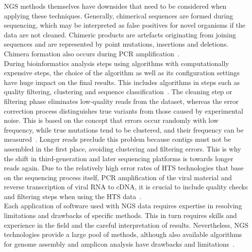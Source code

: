 \ac{NGS} methods themselves have downsides that need to be considered when applying these techniques. Generally, chimerical sequences are formed during sequencing, which may be interpreted as false positives for novel organisms if the data are not cleaned. Chimeric products are artefacts originating from joining sequences and are represented by point mutations, insertions and deletions. Chimera formation also occurs during \ac{PCR} amplification~\cite{zylstra1998pcr}.\\
During bioinformatics analysis steps using algorithms with computationally expensive steps, the choice of the algorithm as well as its configuration settings have huge impact on the final results. This includes algorithms in steps such as quality filtering, clustering and sequence classification~\cite{kopylova2016open}. The cleaning step or filtering phase eliminates low-quality reads from the dataset, whereas the error correction process distinguishes true variants from those caused by experimental noise. This is based on the concept that errors occur randomly with low frequency, while true mutations tend to be clustered, and their frequency can be measured~\cite{zagordi2010error}. Longer reads preclude this problem because contigs must not be assembled in the first place, avoiding clustering and filtering errors. This is why the shift in third-generation and later sequencing platforms is towards longer reads again. Due to the relatively high error rates of \ac{HTS} technologies that base on the sequencing process itself, \ac{PCR} amplification of the viral material and reverse transcription of viral \ac{RNA} to \ac{cDNA}, it is crucial to include quality checks and filtering steps when using the \ac{HTS} data~\cite{beerenwinkel2012challenges}. \\
Each application of software used with \ac{NGS} data requires expertise in resolving limitations and drawbacks of specific methods. This in turn requires skills and experience in the field and the careful interpretation of results. Nevertheless, \ac{NGS} technologies provide a large pool of methods, although also available algorithms for genome assembly and amplicon analysis have drawbacks and limitations~\cite{finotello2012comparative}.

